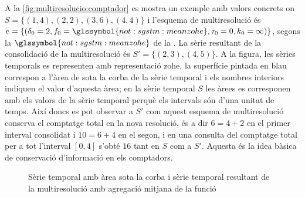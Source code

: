 \begin{itemize}
    A la \autoref{fig:multiresolucio:comptador} es mostra un exemple
    amb valors concrets on $S=\{ (1,4),(2,2),(3,6),(4,4)\}$ i
    l'esquema de multiresolució és
    $e=\{(\delta_0=2,f_0=\glssymbol{not:sgstm:meanzohe},\tau_0=0,k_0=\infty)\}$,
    segons la $\glssymbol{not:sgstm:meanzohe}$ de la
    . La sèrie resultant de la
    consolidació de la multiresolució és $S'=\{ (2,3),(4,5)\}$. A la
    figura, les sèries temporals es representen amb representació
    \gls{zohe}, la superfície pintada en blau correspon a l'àrea de
    sota la corba de la sèrie temporal i els nombres interiors
    indiquen el valor d'aquesta àrea; en la sèrie temporal $S$ les
    àrees es corresponen amb els valors de la sèrie temporal perquè
    els intervals són d'una unitat de temps. Així doncs es pot
    observar a $S'$ com aquest esquema de multiresolució conserva el
    comptatge total en la nova resolució, és a dir $6=4+2$ en el
    primer interval consolidat i $10=6+4$ en el segon, i en una
    consulta del comptatge total per a tot l'interval $[0,4]$ s'obté
    $16$ tant en $S$ com a $S'$. Aquesta és la idea bàsica de
    conservació d'informació en els comptadors.



\begin{figure}[tp]
  \centering


     \qquad


      \caption{Sèrie temporal amb àrea sota la corba i sèrie temporal
        resultant de la multiresolució amb agregació mitjana de la
        funció}
  \label{fig:multiresolucio:comptador}
\end{figure}






  \end{itemize}
  


